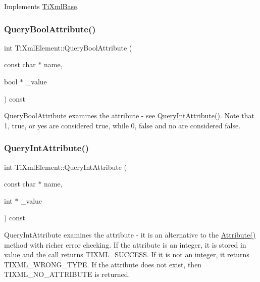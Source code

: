 Implements \hyperlink{class_ti_xml_base_a0de56b3f2ef14c65091a3b916437b512}{Ti\+Xml\+Base}.

\hypertarget{class_ti_xml_element_a5789b1488af75b6ae37a749700495ceb}{}\label{class_ti_xml_element_a5789b1488af75b6ae37a749700495ceb} 
\subsubsection{\texorpdfstring{Query\+Bool\+Attribute()}{QueryBoolAttribute()}}
{\footnotesize\ttfamily int Ti\+Xml\+Element\+::\+Query\+Bool\+Attribute (\begin{DoxyParamCaption}\item[{const char $\ast$}]{name,  }\item[{bool $\ast$}]{\+\_\+value }\end{DoxyParamCaption}) const}

Query\+Bool\+Attribute examines the attribute -\/ see \hyperlink{class_ti_xml_element_a5c0f739e0f6f5905a201364532e54a60}{Query\+Int\+Attribute()}. Note that \textquotesingle{}1\textquotesingle{}, \textquotesingle{}true\textquotesingle{}, or \textquotesingle{}yes\textquotesingle{} are considered true, while \textquotesingle{}0\textquotesingle{}, \textquotesingle{}false\textquotesingle{} and \textquotesingle{}no\textquotesingle{} are considered false. \hypertarget{class_ti_xml_element_a5c0f739e0f6f5905a201364532e54a60}{}\label{class_ti_xml_element_a5c0f739e0f6f5905a201364532e54a60} 
\subsubsection{\texorpdfstring{Query\+Int\+Attribute()}{QueryIntAttribute()}}
{\footnotesize\ttfamily int Ti\+Xml\+Element\+::\+Query\+Int\+Attribute (\begin{DoxyParamCaption}\item[{const char $\ast$}]{name,  }\item[{int $\ast$}]{\+\_\+value }\end{DoxyParamCaption}) const}

Query\+Int\+Attribute examines the attribute -\/ it is an alternative to the \hyperlink{class_ti_xml_element_a6042f518748f475a7ac4b4e0b509eb05}{Attribute()} method with richer error checking. If the attribute is an integer, it is stored in \textquotesingle{}value\textquotesingle{} and the call returns T\+I\+X\+M\+L\+\_\+\+S\+U\+C\+C\+E\+SS. If it is not an integer, it returns T\+I\+X\+M\+L\+\_\+\+W\+R\+O\+N\+G\+\_\+\+T\+Y\+PE. If the attribute does not exist, then T\+I\+X\+M\+L\+\_\+\+N\+O\+\_\+\+A\+T\+T\+R\+I\+B\+U\+TE is returned. \hypertarget{class_ti_xml_element_a7530db879b81ebaba61bf62a9770d204}{}\label{class_ti_xml_element_a7530db879b81ebaba61bf62a9770d204} 
